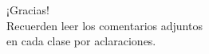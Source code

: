 \documentclass[aspectratio=169]{beamer}
\begin{document}
\begin{frame}[plain]
    \begin{center}
    \vspace{2cm}
    \huge ¡Gracias!\\
    \vspace{2cm}
    \normalsize Recuerden leer los comentarios adjuntos\\ en cada clase por aclaraciones.
    \end{center}
\end{frame}
\end{document}
